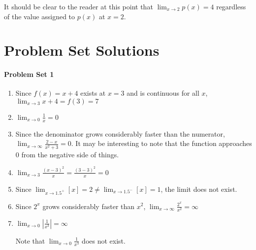 \documentclass[10pt,a4paper]{book}
\begin{document}
It should be clear to the reader at this point that $\displaystyle\lim_{x \to 2} p(x) = 4$ regardless of the value assigned to $p(x)$ at $x=2$.

\chapter{Problem Set Solutions}
\newpage
\begin{multicols}{2}
\subsubsection*{Problem Set 1}
\begin{enumerate}
	\item Since $f(x)=x+4$ exists at $x=3$ and is continuous for all $x$, $\displaystyle \lim_{x \to 3} {x+4} = f(3) = 7$
    \item $\displaystyle \lim_{x \to 0} {\frac{1}{x}} = 0$
    \item Since the denominator grows considerably faster than the numerator, $\displaystyle \lim_{x \to \infty} {\frac{2-x}{x^{2}+3}} = 0$. It may be interesting to note that the function approaches 0 from the negative side of things.
    \item $\displaystyle \lim_{x \to 3} {\frac{\left(x-3\right)^{2}}{x}} = {\frac{\left(3-3\right)^{2}}{x}} = 0$
    \item Since $\displaystyle \lim_{x \to 1.5^{+}} {\left[x\right]} = 2 \neq \lim_{x \to 1.5^{-}} {\left[x\right]} = 1$, the limit does not exist.
    
    \item Since $2^{x}$ grows considerably faster than $x^{2}$, $\displaystyle \lim_{x \to \infty} {\frac{2^{x}}{x^{2}}} = \infty$
    \item $\displaystyle \lim_{x \to 0} {\left|\frac{1}{x^{3}}\right|} = \infty$
    
    Note that $\displaystyle \lim_{x \to 0} {\frac{1}{x^{3}}}$ does not exist.
\end{enumerate}
\end{multicols}
\end{document}
